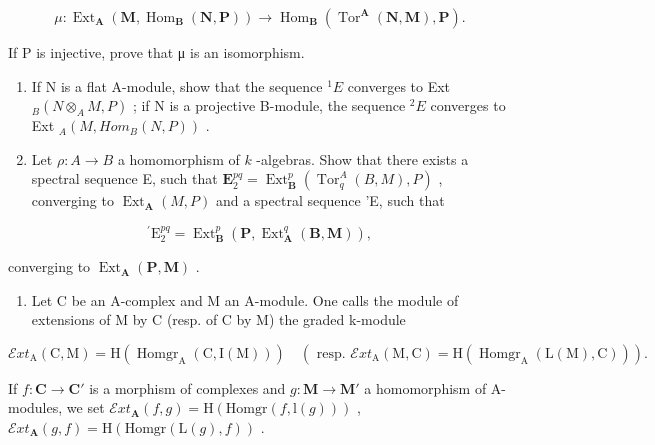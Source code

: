 \[
\mu : \operatorname{Ext} _ {\mathbf {A}} (\mathbf {M}, \operatorname{Hom} _ {\mathbf {B}} (\mathbf {N}, \mathbf {P})) \rightarrow \operatorname{Hom} _ {\mathbf {B}} \left(\operatorname{Tor} ^ {\mathbf {A}} (\mathbf {N}, \mathbf {M}), \mathbf {P}\right).
\]

If P is injective, prove that μ is an isomorphism.

\begin{enumerate}
\def\labelenumi{\alph{enumi})}
\setcounter{enumi}{2}
\item
  If N is a flat A-module, show that the sequence \({}^{1}E\) converges to Ext \(_{B}(N \otimes_{A} M, P)\) ; if N is a projective B-module, the sequence \({}^{2}E\) converges to Ext \(_{A}(M, Hom_{B}(N, P))\) .
\item
  Let \(\rho: A \to B\) a homomorphism of \(k\) -algebras. Show that there exists a spectral sequence E, such that \(\mathbf{E}_2^{pq} = \operatorname{Ext}_{\mathbf{B}}^p (\operatorname{Tor}_q^A(B, M), P)\) , converging to \(\operatorname{Ext}_{\mathbf{A}}(M, P)\) and a spectral sequence 'E, such that
\end{enumerate}

\[
{ } ^ { \prime } \mathrm{E} _ { 2 } ^ { p q } = \operatorname{Ext} _ { \mathbf { B } } ^ { p } ( \mathbf { P } , \operatorname{Ext} _ { \mathbf { A } } ^ { q } ( \mathbf { B } , \mathbf { M } ) ) ,
\]

converging to \(\operatorname{Ext}_{\mathbf{A}}(\mathbf{P}, \mathbf{M})\) .

\begin{enumerate}
\def\labelenumi{\arabic{enumi})}
\setcounter{enumi}{6}
\tightlist
\item
  Let C be an A-complex and M an A-module. One calls the module of extensions of M by C (resp. of C by M) the graded k-module
\end{enumerate}

\[
\mathcal {E} x t _ {\mathrm{A}} (\mathrm{C}, \mathrm{M}) = \mathrm{H} (\operatorname{Homgr} _ {\mathrm{A}} (\mathrm{C}, \mathrm{I} (\mathrm{M}))) \quad \left(\text { resp. } \mathcal {E} x t _ {\mathrm{A}} (\mathrm{M}, \mathrm{C}) = \mathrm{H} (\operatorname{Homgr} _ {\mathrm{A}} (\mathrm{L} (\mathrm{M}), \mathrm{C}))\right).
\]

If \(f: \mathbf{C} \to \mathbf{C}'\) is a morphism of complexes and \(g: \mathbf{M} \to \mathbf{M}'\) a homomorphism of A-modules, we set \(\mathcal{E}xt_{\mathbf{A}}(f, g) = \mathrm{H}(\mathrm{Homgr}(f, \mathrm{l}(g)))\) , \(\mathcal{E}xt_{\mathbf{A}}(g, f) = \mathrm{H}(\mathrm{Homgr}(\mathrm{L}(g), f))\) .

